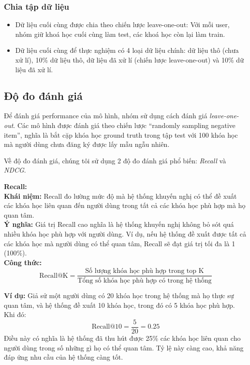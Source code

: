 \subsubsection{Chia tập dữ liệu}
\begin{itemize}
    \item Dữ liệu cuối cùng được chia theo chiến lược leave-one-out: Với mỗi user, nhóm giữ khoá học cuối cùng làm test, các khoá học còn lại làm train. 
    \item Dữ liệu cuối cùng để thực nghiệm có 4 loại dữ liệu chính: dữ liệu thô (chưa xử lí), 10\% dữ liệu thô, dữ liệu đã xử lí (chiến lược leave-one-out) và 10\% dữ liệu đã xử lí.
\end{itemize}

\subsection{Độ đo đánh giá}
Để đánh giá performance của mô hình, nhóm sử dụng cách đánh giá \textit{leave-one-out}. Các mô hình được đánh giá theo chiến lược “randomly sampling negative item”, nghĩa là bắt cặp khóa học ground truth trong tập test với 100 khóa học mà người dùng chưa đăng ký được lấy mẫu ngẫu nhiên.

Về độ đo đánh giá, chúng tôi sử dụng 2 độ đo đánh giá phổ biến: \textit{Recall} và \textit{NDCG}.

\textbf{Recall:} \\
\textbf{Khái niệm:} Recall đo lường mức độ mà hệ thống khuyến nghị có thể đề xuất các khóa học liên quan đến người dùng trong tất cả các khóa học phù hợp mà họ quan tâm. \\
\textbf{Ý nghĩa:} Giá trị Recall cao nghĩa là hệ thống khuyến nghị không bỏ sót quá nhiều khóa học phù hợp với người dùng. Ví dụ, nếu hệ thống đề xuất được tất cả các khóa học mà người dùng có thể quan tâm, Recall sẽ đạt giá trị tối đa là 1 (100\%). \\

\textbf{Công thức:}
\[
\text{Recall@K} = \frac{\text{Số lượng khóa học phù hợp trong top K}}{\text{Tổng số khóa học phù hợp có trong hệ thống}}
\]

\textbf{Ví dụ:} Giả sử một người dùng có 20 khóa học trong hệ thống mà họ thực sự quan tâm, và hệ thống đề xuất 10 khóa học, trong đó có 5 khóa học phù hợp. Khi đó:
\[
\text{Recall@10} = \frac{5}{20} = 0.25
\]
Điều này có nghĩa là hệ thống đã thu hút được 25\% các khóa học liên quan cho người dùng trong số những gì họ có thể quan tâm. Tỷ lệ này càng cao, khả năng đáp ứng nhu cầu của hệ thống càng tốt.

